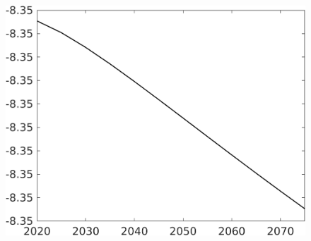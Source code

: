 \documentclass[12pt]{article}
\begin{document}
\begin{figure}[h!!]
\begin{minipage}[]{0.32\textwidth}
	\end{minipage}
	\begin{minipage}[]{0.32\textwidth}
		\includegraphics[width=1\textwidth]{../../codding_model/own_basedOnFried/optimalPol_010922_revision/figures/all_13Sept22/CompTaul_LFBAUPer_Reg0_N_spillover0_nsk0_xgr1_knspil0_sep1_countec0_GovRev0_etaa0.79.png}
	\end{minipage}
\end{figure}
\end{document}
